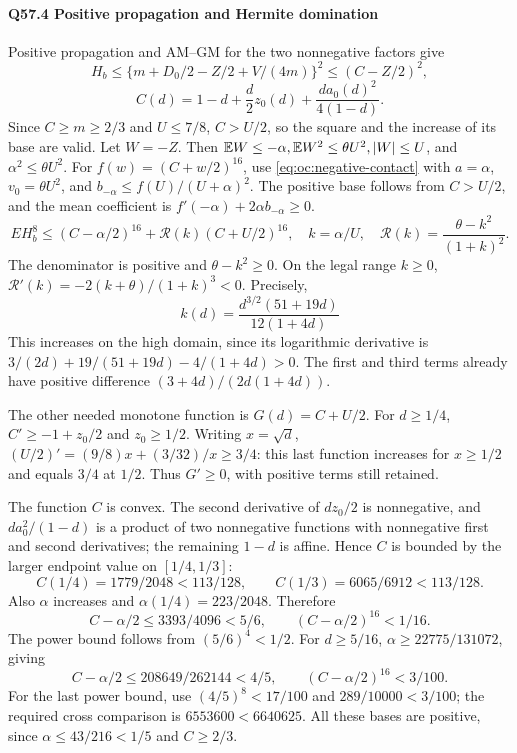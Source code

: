 \paragraph{Q57.4 Positive propagation and Hermite domination}
Positive propagation and AM--GM for the two nonnegative factors give
\[
H_b\le\{m+D_0/2-Z/2+V/(4m)\}^2
\le(C-Z/2)^2,
\]
\[
C(d)=1-d+\frac d2 z_0(d)+\frac{d a_0(d)^2}{4(1-d)}. \tag{Q57.4.1}\label{eq:Q57:4.1}
\]
Since \(C\ge\allowbreak  m\ge\allowbreak 2/3\) and \(U\le\allowbreak 7/8\), \(C>\allowbreak U/2\), so the square and the increase of its base are valid.
Let \(W=\allowbreak -Z\). Then
\(\mathbb E W\le\allowbreak -\alpha,\allowbreak \mathbb E W^2\le\allowbreak \theta U^2,\allowbreak |W|\le\allowbreak  U\), and
\(\alpha^2\le\allowbreak \theta U^2\).
For \(f(w)=(C+w/2)^{16}\), use \eqref{eq:oc:negative-contact}
with \(a=\alpha\), \(v_0=\theta U^2\), and
\(b_{-\alpha}\le f(U)/(U+\alpha)^2\). The positive base follows from
\(C>U/2\), and the mean coefficient is \(f'(-\alpha)+2\alpha b_{-\alpha}\ge0\).
\[
EH_b^8\le(C-\alpha/2)^{16}
 +\mathcal R(k)(C+U/2)^{16},\quad
k=\alpha/U,\quad
\mathcal R(k)=\frac{\theta-k^2}{(1+k)^2}. \tag{Q57.4.2}\label{eq:Q57:4.2}
\]
The denominator is positive and \(\theta-k^2\ge\allowbreak 0\). On the legal range \(k\ge\allowbreak 0\),
\(\mathcal R'(k)=\allowbreak -2(k+\theta)/(1+k)^3<\allowbreak 0\).
Precisely,
\[
k(d)=\frac{d^{3/2}(51+19d)}{12(1+4d)}
\]
This increases on the high domain, since its logarithmic derivative is
\(3/(2d)+19/(51+19d)-4/(1+4d)>\allowbreak 0\).
The first and third terms already have positive difference
\((3+4d)/(2d(1+4d))\).

The other needed monotone function is \(G(d)=\allowbreak C+U/2\).
For \(d\ge\allowbreak 1/4\), \(C'\ge\allowbreak -1+z_0/2\) and \(z_0\ge\allowbreak 1/2\).
Writing \(x=\allowbreak \sqrt d\),
\((U/2)'=\allowbreak (9/8)x+(3/32)/x\ge\allowbreak 3/4\): this last function increases for \(x\ge\allowbreak 1/2\) and equals \(3/4\) at \(1/2\).
Thus \(G'\ge\allowbreak 0\), with positive terms still retained.

The function \(C\) is convex. The second derivative of \(dz_0/2\) is nonnegative, and \(da_0^2/(1-d)\) is a product of two nonnegative functions with nonnegative first and second derivatives; the remaining \(1-d\) is affine.
Hence \(C\) is bounded by the larger endpoint value on \([1/4,\allowbreak 1/3]\):
\[
C(1/4)=1779/2048<113/128,\qquad
C(1/3)=6065/6912<113/128 .
\]
Also \(\alpha\) increases and \(\alpha(1/4)=\allowbreak 223/2048\). Therefore
\[
C-\alpha/2\le3393/4096<5/6,
\qquad(C-\alpha/2)^{16}<1/16. \tag{Q57.4.3}\label{eq:Q57:4.3}
\]
The power bound follows from \((5/6)^4<\allowbreak 1/2\).
For \(d\ge\allowbreak 5/16\), \(\alpha\ge\allowbreak 22775/131072\), giving
\[
C-\alpha/2\le208649/262144<4/5,
\qquad(C-\alpha/2)^{16}<3/100 . \tag{Q57.4.4}\label{eq:Q57:4.4}
\]
For the last power bound, use \((4/5)^8<\allowbreak 17/100\) and
\(289/10000<\allowbreak 3/100\); the required cross comparison is
\(6553600<\allowbreak 6640625\).
All these bases are positive, since \(\alpha\le\allowbreak 43/216<\allowbreak 1/5\) and \(C\ge\allowbreak 2/3\).

